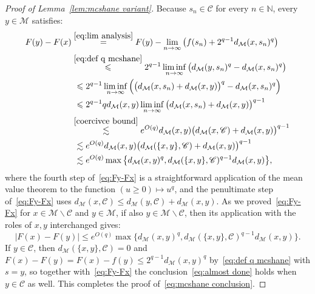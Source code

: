 \documentclass[11pt,reqno]{amsart}
\newcommand{\N}{\mathbb{N}}
\renewcommand{\le}{\leqslant}
\renewcommand{\ge}{\geqslant}
\renewcommand{\setminus}{\smallsetminus}
\newcommand{\MM}{\mathcal{M}}
\newcommand{\sub}{\mathscr{C}}
\begin{document}
\begin{proof}[Proof of Lemma~\ref{lem:mcshane variant}]
Because $s_n\in \sub$ for every $n\in \N$, every $y\in \MM$ satisfies:
\begin{align}\label{eq:Fy-Fx}
\begin{split}
F(y)-F(x)&\stackrel{\eqref{eq:lim analysis}}{=}F(y)-\lim_{n\to \infty}\big(f(s_n)+2^{q-1}d_\MM(x,s_n)^q\big)\\&\stackrel{\eqref{eq:def q mcshane}}{\le} 2^{q-1}\liminf_{n\to\infty} \big(d_\MM(y,s_n)^q-d_\MM(x,s_n)^q\big)\\&\ \le 2^{q-1}\liminf_{n\to\infty}\Big(\big(d_\MM(x,s_n)+d_\MM(x,y)\big)^q-d_\MM(x,s_n)^q\Big)\\&\ \le2^{q-1}q d_\MM(x,y)\liminf_{n\to\infty}
\big(d_\MM(x,s_n)+d_\MM(x,y)\big)^{q-1}\\ 
&\stackrel{\eqref{coercivce bound}}{\lesssim} e^{O(q)} d_\MM(x,y)\big(d_\MM(x,\sub)+d_\MM(x,y)\big)^{q-1}\\
&\ \lesssim e^{O(q)} d_\MM(x,y)\big(d_\MM(\{x,y\},\sub)+d_\MM(x,y)\big)^{q-1}\\
&\ \lesssim e^{O(q)}\max\big\{d_\MM(x,y)^{q},d_\MM(\{x,y\},\sub)^{q-1}d_\MM(x,y)\big\},
\end{split}
\end{align}
where the fourth step of~\eqref{eq:Fy-Fx} is a straightforward application of the mean value theorem to the function $(u\ge 0)\mapsto u^q$, and the penultimate step of~\eqref{eq:Fy-Fx} uses $d_\MM(x,\sub)\le d_\MM(y,\sub)+d_\MM(x,y)$. As we proved~\eqref{eq:Fy-Fx} for $x\in \MM\setminus \sub$ and $y\in \MM$, if also $y\in \MM\setminus \sub$, then its application with the roles of $x,y$ interchanged gives: 
\begin{equation}\label{eq:almost done}
|F(x)-F(y)|\le e^{O(q)}\max\big\{d_\MM(x,y)^{q},d_\MM(\{x,y\},\sub)^{q-1}d_\MM(x,y)\big\}.
\end{equation}
If $y\in \sub$, then $d_\MM(\{x,y\},\sub)=0$ and  $F(x)-F(y)=F(x)-f(y)\le 2^{q-1} d_\MM(x,y)^q$ by~\eqref{eq:def q mcshane} with $s=y$, so  together with~\eqref{eq:Fy-Fx}  the conclusion~\eqref{eq:almost done} holds when $y\in \sub$ as well. This completes the proof of~\eqref{eq:mcshane conclusion}.
\end{proof}
\end{document}
